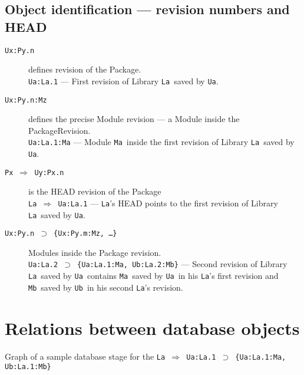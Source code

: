 \documentclass[10pt]{article}
\def\Ua{{\tt Ua}}
\def\Ub{{\tt Ub}}
\def\La{{\tt La}}
\def\Ma{{\tt Ma}}
\def\Mb{{\tt Mb}}
\def\headsto{${\Longrightarrow}$ }
\def\hto{\headsto}
\def\eq{${\supset}$ }
\begin{document}
	\subsection{Object identification --- revision numbers and HEAD}
	\begin{description}
		\item[{\tt Ux:Py.n}] defines revision of the Package.\\ 
			{\tt Ua:La.1} --- First revision of Library \La\ saved by \Ua.
		\item[{\tt Ux:Py.n:Mz}] defines the precise Module revision --- a Module inside the PackageRevision. \\ 
			{\tt Ua:La.1:Ma} --- Module \Ma\ inside the first revision of Library \La\ saved by \Ua.
		\item[{\tt Px \hto  Uy:Px.n}] is the HEAD revision of the Package\\ 
			{\tt La \hto  Ua:La.1} --- \La's HEAD points to the first revision of Library \La\ saved by \Ua.
		\item[{\tt Ux:Py.n \eq \{Ux:Py.m:Mz, \ldots\}}] Modules inside the Package revision.\\ 
			{\tt Ua:La.2 \eq \{Ua:La.1:Ma, Ub:La.2:Mb\}} --- Second revision of Library \La\ saved by \Ua\ contains \Ma\ saved by \Ua\ in his \La's first revision and \Mb\ saved by \Ub\ in his second \La's revision.
	\end{description}

\section{Relations between database objects}
	Graph of a sample database stage for the {\tt La \hto Ua:La.1 \eq \{Ua:La.1:Ma, Ub:La.1:Mb\}}
	
\end{document}
